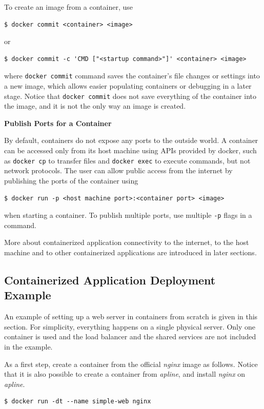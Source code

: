 To create an image from a container, use
\begin{lstlisting}
$ docker commit <container> <image>
\end{lstlisting}
or
\begin{lstlisting}
$ docker commit -c 'CMD ["<startup command>"]' <container> <image>
\end{lstlisting}
where \verb|docker commit| command saves the container's file changes or settings into a new image, which allows easier populating containers or debugging in a later stage. Notice that \verb|docker commit| does not save everything of the container into the image, and it is not the only way an image is created.

\vspace{0.1in}
\noindent \textbf{Publish Ports for a Container}
\vspace{0.1in}

By default, containers do not expose any ports to the outside world. A container can be accessed only from its host machine using APIs provided by docker, such as \verb|docker cp| to transfer files and \verb|docker exec| to execute commands, but not network protocols. The user can allow public access from the internet by publishing the ports of the container using
\begin{lstlisting}
$ docker run -p <host machine port>:<container port> <image>
\end{lstlisting}
when starting a container. To publish multiple ports, use multiple \verb|-p| flags in a command.

More about containerized application connectivity to the internet, to the host machine and to other containerized applications are introduced in later sections.

\subsection{Containerized Application Deployment Example}

An example of setting up a web server in containers from scratch is given in this section. For simplicity, everything happens on a single physical server. Only one container is used and the load balancer and the shared services are not included in the example.

As a first step, create a container from the official \textit{nginx} image as follows. Notice that it is also possible to create a container from \textit{apline}, and install \textit{nginx} on \textit{apline}.
\begin{lstlisting}
$ docker run -dt --name simple-web nginx
\end{lstlisting}

